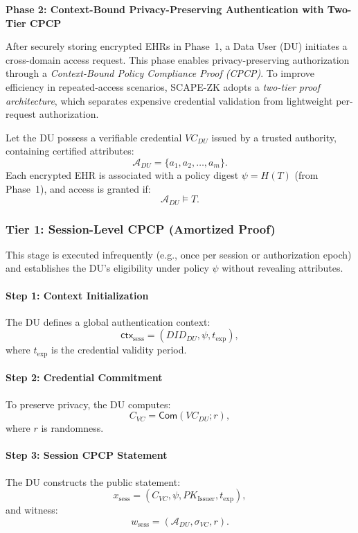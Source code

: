 \documentclass[conference]{IEEEtran}
\begin{document}
\textbf{Phase 2: Context-Bound Privacy-Preserving Authentication with Two-Tier CPCP}
\label{sec:phase2}

After securely storing encrypted EHRs in Phase~1, a Data User (DU) initiates a cross-domain access request. This phase enables privacy-preserving authorization through a \emph{Context-Bound Policy Compliance Proof (CPCP)}. To improve efficiency in repeated-access scenarios, SCAPE-ZK adopts a \emph{two-tier proof architecture}, which separates expensive credential validation from lightweight per-request authorization.

Let the DU possess a verifiable credential $VC_{DU}$ issued by a trusted authority, containing certified attributes:
\[
\mathcal{A}_{DU} = \{a_1, a_2, \ldots, a_m\}.
\]
Each encrypted EHR is associated with a policy digest $\psi = H(T)$ (from Phase~1), and access is granted if:
\[
\mathcal{A}_{DU} \models T.
\]

\subsubsection*{Tier 1: Session-Level CPCP (Amortized Proof)}

This stage is executed infrequently (e.g., once per session or authorization epoch) and establishes the DU's eligibility under policy $\psi$ without revealing attributes.

\paragraph*{\textbf{Step 1: Context Initialization}}

The DU defines a global authentication context:
\[
\mathsf{ctx}_{\mathrm{sess}} = (DID_{DU}, \psi, t_{\mathrm{exp}}),
\]
where $t_{\mathrm{exp}}$ is the credential validity period.

\paragraph*{\textbf{Step 2: Credential Commitment}}

To preserve privacy, the DU computes:
\[
C_{VC} = \mathsf{Com}(VC_{DU}; r),
\]
where $r$ is randomness.

\paragraph*{\textbf{Step 3: Session CPCP Statement}}

The DU constructs the public statement:
\[
x_{\mathrm{sess}} = (C_{VC}, \psi, PK_{\mathrm{Issuer}}, t_{\mathrm{exp}}),
\]
and witness:
\[
w_{\mathrm{sess}} = (\mathcal{A}_{DU}, \sigma_{VC}, r).
\]
\end{document}
